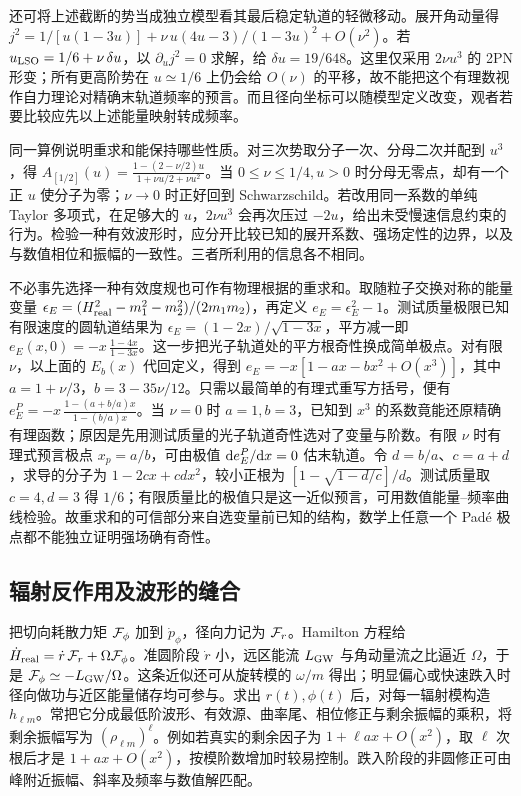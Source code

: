 还可将上述截断的势当成独立模型看其最后稳定轨道的轻微移动。展开角动量得 $j^2=1/[u(1-3u)]+\nu\,u(4u-3)/(1-3u)^2+O(\nu^2)$。若 $u_{\rm LSO}=1/6+\nu\,\delta u$，以 $\partial_u j^2=0$ 求解，给 $\delta u=19/648$。这里仅采用 $2\nu u^3$ 的 2PN 形变；所有更高阶势在 $u\simeq1/6$ 上仍会给 $O(\nu)$ 的平移，故不能把这个有理数视作自力理论对精确末轨道频率的预言。而且径向坐标可以随模型定义改变，观者若要比较应先以上述能量映射转成频率。

同一算例说明重求和能保持哪些性质。对三次势取分子一次、分母二次并配到 $u^3$，得 $A_{[1/2]}(u)=\frac{1-(2-\nu/2)u}{1+\nu u/2+\nu u^2}$。当 $0\le\nu\le1/4,u>0$ 时分母无零点，却有一个正 $u$ 使分子为零；$\nu\to0$ 时正好回到 Schwarzschild。若改用同一系数的单纯 Taylor 多项式，在足够大的 $u$，$2\nu u^3$ 会再次压过 $-2u$，给出未受慢速信息约束的行为。检验一种有效波形时，应分开比较已知的展开系数、强场定性的边界，以及与数值相位和振幅的一致性。三者所利用的信息各不相同。

不必事先选择一种有效度规也可作有物理根据的重求和。取随粒子交换对称的能量变量 $\epsilon_E=(H_{\rm real}^2-m_1^2-m_2^2)/(2m_1m_2)$，再定义 $e_E=\epsilon_E^2-1$。测试质量极限已知有限速度的圆轨道结果为 $\epsilon_E=(1-2x)/\sqrt{1-3x}$，平方减一即 $e_E(x,0)=-x\,\frac{1-4x}{1-3x}$。这一步把光子轨道处的平方根奇性换成简单极点。对有限 $\nu$，以上面的 $E_b(x)$ 代回定义，得到 $e_E=-x[1-a x-b x^2+O(x^3)]$，其中 $a=1+\nu/3$，$b=3-35\nu/12$。只需以最简单的有理式重写方括号，便有 $e_E^{P}=-x\,\frac{1-(a+b/a)x}{1-(b/a)x}$。当 $\nu=0$ 时 $a=1,b=3$，已知到 $x^3$ 的系数竟能还原精确有理函数；原因是先用测试质量的光子轨道奇性选对了变量与阶数。有限 $\nu$ 时有理式预言极点 $x_p=a/b$，可由极值 $\dd e_E^P/\dd x=0$ 估末轨道。令 $d=b/a$、$c=a+d$，求导的分子为 $1-2cx+cdx^2$，较小正根为 $[1-\sqrt{1-d/c}]/d$。测试质量取 $c=4,d=3$ 得 $1/6$；有限质量比的极值只是这一近似预言，可用数值能量--频率曲线检验。故重求和的可信部分来自选变量前已知的结构，数学上任意一个 Padé 极点都不能独立证明强场确有奇性。

\subsection{辐射反作用及波形的缝合}

把切向耗散力矩 ${\cal F}_\phi$ 加到 $\dot p_\phi$，径向力记为 ${\cal F}_r$。Hamilton 方程给 $\dot H_{\rm real}=\dot r\,{\cal F}_r+\Omega{\cal F}_\phi$。准圆阶段 $\dot r$ 小，远区能流 $L_{\rm GW}$ 与角动量流之比逼近 $\Omega$，于是 ${\cal F}_\phi\simeq-L_{\rm GW}/\Omega$。这条近似还可从旋转模的 $\omega/m$ 得出；明显偏心或快速跌入时径向做功与近区能量储存均可参与。求出 $r(t),\phi(t)$ 后，对每一辐射模构造 $h_{\ell m}$。常把它分成最低阶波形、有效源、曲率尾、相位修正与剩余振幅的乘积，将剩余振幅写为 $(\rho_{\ell m})^\ell$。例如若真实的剩余因子为 $1+\ell a x+O(x^2)$，取 $\ell$ 次根后才是 $1+a x+O(x^2)$，按模阶数增加时较易控制。跌入阶段的非圆修正可由峰附近振幅、斜率及频率与数值解匹配。

